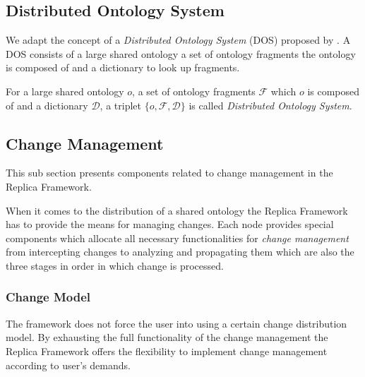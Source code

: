

\newpage


\subsection{Distributed Ontology System}
We adapt the concept of a  \emph{Distributed Ontology System} (DOS)
proposed by \cite{chen09}. A DOS consists of a large shared ontology
a set of ontology fragments the ontology is composed of and a dictionary
to look up fragments.

\begin{definition} For a large shared ontology
$o$, a set of ontology fragments $\mathcal{F}$ which $o$ is composed of
and a dictionary $\mathcal{D}$, a triplet $\{o,\mathcal{F},\mathcal{D}\}$
is called \emph{Distributed Ontology System}.
\end{definition}

\subsection{Change Management}
\label{changemanagement}
This sub section presents components related to change management in
the Replica Framework.

When it comes to the distribution of a shared ontology the Replica Framework has
to provide the means for managing changes. Each node provides special
components which allocate all necessary functionalities for \emph{change management}
from intercepting changes to analyzing and propagating them which are
also the three stages in order in which change is processed.

\subsubsection{Change Model}
The framework does not force the user into using a certain change distribution
model. By exhausting the full functionality of the change management
the Replica Framework offers the flexibility to implement change management
according to user's demands.

